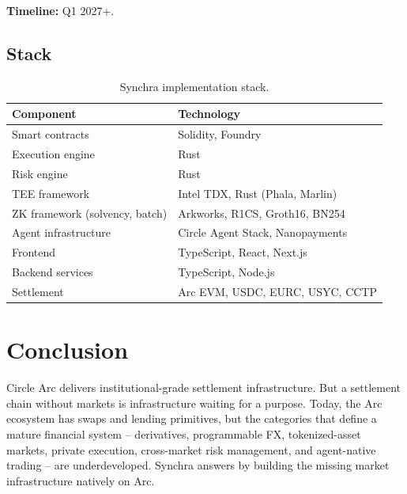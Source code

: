\documentclass[11pt,a4paper]{article}
\begin{document}
\textbf{Timeline:} Q1 2027+.

\subsection{Stack}

\begin{table}[h]
  \centering
  \begin{tabular}{ll}
    \toprule
    \textbf{Component} & \textbf{Technology} \\
    \midrule
    Smart contracts & Solidity, Foundry \\
    Execution engine & Rust \\
    Risk engine & Rust \\
    TEE framework & Intel TDX, Rust (Phala, Marlin) \\
    ZK framework (solvency, batch) & Arkworks, R1CS, Groth16, BN254 \\
    Agent infrastructure & Circle Agent Stack, Nanopayments \\
    Frontend & TypeScript, React, Next.js \\
    Backend services & TypeScript, Node.js \\
    Settlement & Arc EVM, USDC, EURC, USYC, CCTP \\
    \bottomrule
  \end{tabular}
  \caption{Synchra implementation stack.}
  \label{tab:stack}
\end{table}

\section{Conclusion}
\label{sec:conclusion}

Circle Arc delivers institutional-grade settlement infrastructure. But a settlement chain without markets is infrastructure waiting for a purpose. Today, the Arc ecosystem has swaps and lending primitives, but the categories that define a mature financial system -- derivatives, programmable FX, tokenized-asset markets, private execution, cross-market risk management, and agent-native trading -- are underdeveloped. Synchra answers by building the missing market infrastructure natively on Arc.
\end{document}
